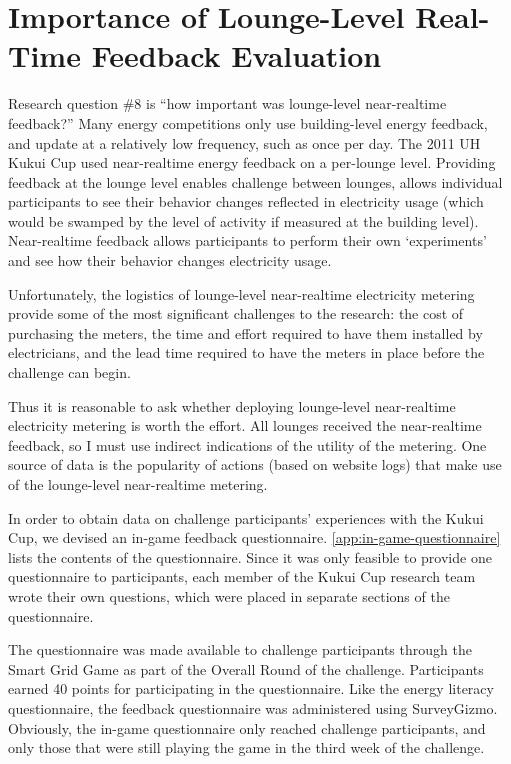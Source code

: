 \section{Importance of Lounge-Level Real-Time Feedback Evaluation}
\label{sec:exp-lounge-level}

Research question \#8 is ``how important was lounge-level near-realtime feedback?'' Many energy competitions only use building-level energy feedback, and update at a relatively low frequency, such as once per day. The 2011 UH Kukui Cup used near-realtime energy feedback on a per-lounge level. Providing feedback at the lounge level enables challenge between lounges, allows individual participants to see their behavior changes reflected in electricity usage (which would be swamped by the level of activity if measured at the building level). Near-realtime feedback allows participants to perform their own `experiments' and see how their behavior changes electricity usage.

Unfortunately, the logistics of lounge-level near-realtime electricity metering provide some of the most significant challenges to the research: the cost of purchasing the meters, the time and effort required to have them installed by electricians, and the lead time required to have the meters in place before the challenge can begin.

Thus it is reasonable to ask whether deploying lounge-level near-realtime electricity metering is worth the effort. All lounges received the near-realtime feedback, so I must use indirect indications of the utility of the metering. One source of data is the popularity of actions (based on website logs) that make use of the lounge-level near-realtime metering.

In order to obtain data on challenge participants' experiences with the Kukui Cup, we devised an in-game feedback questionnaire. \autoref{app:in-game-questionnaire} lists the contents of the questionnaire. Since it was only feasible to provide one questionnaire to participants, each member of the Kukui Cup research team wrote their own questions, which were placed in separate sections of the questionnaire.

The questionnaire was made available to challenge participants through the Smart Grid Game as part of the Overall Round of the challenge. Participants earned 40 points for participating in the questionnaire. Like the energy literacy questionnaire, the feedback questionnaire was administered using SurveyGizmo. Obviously, the in-game questionnaire only reached challenge participants, and only those that were still playing the game in the third week of the challenge.


